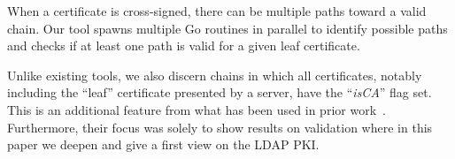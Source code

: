 






When a certificate is cross-signed, there can be multiple paths toward a valid chain. Our tool spawns multiple Go routines in parallel to identify possible paths and checks if at least one path is valid for a given leaf certificate. 

Unlike existing tools, we also discern chains in which all certificates, notably including the ``leaf'' certificate presented by a server, have the ``\textit{isCA}'' flag set. This is an additional feature from what has been used in prior work~\cite{landscape}. Furthermore, their focus was solely to show results on validation where in this paper we deepen and give a first view on the \gls{LDAP} \gls{PKI}.

